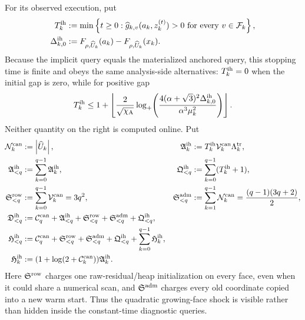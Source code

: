 For its observed execution, put
\begin{align}
 T_k^{\rm ih}
 &:=\min\left\{t\geq0:
   \widehat g_{k,v}(a_k,z_k^{(t)})>0
   \text{ for every }v\in\mathcal F_k\right\},
 \notag\\
 \Delta_{k,0}^{\rm ih}
 &:=F_{\rho,\widehat U_k}(a_k)
    -F_{\rho,\widehat U_k}(x_k).
 \label{eq:branch-caterpillar-implicit-lower-stopping-time}
\end{align}
Because the implicit query equals the materialized anchored query, this
stopping time is finite and obeys the same analysis-side alternatives:
$T_k^{\rm ih}=0$ when the initial gap is zero, while for positive gap
\begin{equation}
 T_k^{\rm ih}\leq
 1+\left\lfloor\frac{2}{\sqrt{\chi_{\rm A}}}
 \log_+\!\left(
 \frac{4(\alpha+\sqrt3)^2\Delta_{k,0}^{\rm ih}}
      {\alpha^3\mu_k^2}
             \right)\right\rfloor.
 \label{eq:branch-caterpillar-implicit-lower-stage-bound}
\end{equation}
Neither quantity on the right is computed online.  Put
\begin{align}
 \mathcal N_k^{\rm can}&:=\left\lvert \widehat U_k \right\rvert,
 &
 \mathfrak A_k^{\rm ih}
 &:=T_k^{\rm ih}\mathcal V_k^{\rm can}\Lambda_k^{\rm tr},
 \notag\\
 \mathfrak A_{<q}^{\rm ih}&:=\sum_{k=0}^{q-1}\mathfrak A_k^{\rm ih},
 &
 \mathfrak Q_{<q}^{\rm ih}&:=\sum_{k=0}^{q-1}(T_k^{\rm ih}+1),
 \notag\\
 \mathfrak S_{<q}^{\rm row}
 &:=\sum_{k=0}^{q-1}\mathcal V_k^{\rm can}=3q^2,
 &
 \mathfrak S_{<q}^{\rm adm}
 &:=\sum_{k=1}^{q-1}\mathcal N_k^{\rm can}
   =\frac{(q-1)(3q+2)}2,
 \label{eq:branch-caterpillar-implicit-lower-shock}\\
 \mathfrak D_{<q}^{\rm ih}
 &:=\mathcal C_q^{\rm can}
   +\mathfrak A_{<q}^{\rm ih}
   +\mathfrak S_{<q}^{\rm row}
   +\mathfrak S_{<q}^{\rm adm}
   +\mathfrak Q_{<q}^{\rm ih},
 \notag\\
 \mathfrak H_{<q}^{\rm ih}
 &:=\mathcal C_q^{\rm can}
   +\mathfrak S_{<q}^{\rm row}
   +\mathfrak S_{<q}^{\rm adm}
   +\mathfrak Q_{<q}^{\rm ih}
   +\sum_{k=0}^{q-1}\mathfrak H_k^{\rm ih},
 \notag\\
 \mathfrak H_k^{\rm ih}
 &:= (1+\log(2+\mathcal C_k^{\rm can}))\mathfrak A_k^{\rm ih}.
 \label{eq:branch-caterpillar-implicit-lower-budgets}
\end{align}
Here $\mathfrak S^{\rm row}$ charges one raw-residual/heap initialization on
every face, even when it could share a numerical scan, and
$\mathfrak S^{\rm adm}$ charges every old coordinate copied into a new warm
start.  Thus the quadratic growing-face shock is visible rather than hidden
inside the constant-time diagnostic queries.

